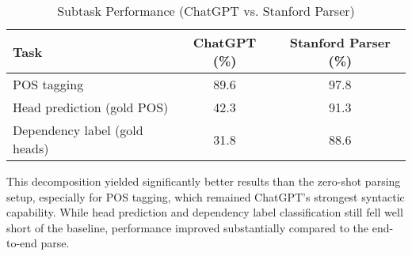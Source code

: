 \begin{table}[h]
\centering
\caption{Subtask Performance (ChatGPT vs. Stanford Parser)}
\label{tab:subtasks}
\begin{tabular}{lcc}
\toprule
\textbf{Task} & \textbf{ChatGPT (\%)} & \textbf{Stanford Parser (\%)} \\
\midrule
POS tagging & 89.6 & 97.8 \\
Head prediction (gold POS) & 42.3 & 91.3 \\
Dependency label (gold heads) & 31.8 & 88.6 \\
\bottomrule
\end{tabular}
\end{table}

This decomposition yielded significantly better results than the zero-shot parsing setup, especially for POS tagging, which remained ChatGPT’s strongest syntactic capability. While head prediction and dependency label classification still fell well short of the baseline, performance improved substantially compared to the end-to-end parse.
